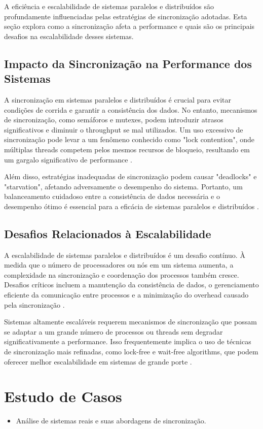 \documentclass[conference]{IEEEtran}
\begin{document}
A eficiência e escalabilidade de sistemas paralelos e distribuídos são profundamente influenciadas pelas estratégias de sincronização adotadas. Esta seção explora como a sincronização afeta a performance e quais são os principais desafios na escalabilidade desses sistemas.

\subsection{Impacto da Sincronização na Performance dos Sistemas}
A sincronização em sistemas paralelos e distribuídos é crucial para evitar condições de corrida e garantir a consistência dos dados. No entanto, mecanismos de sincronização, como semáforos e mutexes, podem introduzir atrasos significativos e diminuir o throughput se mal utilizados. Um uso excessivo de sincronização pode levar a um fenômeno conhecido como "lock contention", onde múltiplas threads competem pelos mesmos recursos de bloqueio, resultando em um gargalo significativo de performance \cite{herlihy2012art}.

Além disso, estratégias inadequadas de sincronização podem causar "deadlocks" e "starvation", afetando adversamente o desempenho do sistema. Portanto, um balanceamento cuidadoso entre a consistência de dados necessária e o desempenho ótimo é essencial para a eficácia de sistemas paralelos e distribuídos \cite{andrews2000foundations}.

\subsection{Desafios Relacionados à Escalabilidade}
A escalabilidade de sistemas paralelos e distribuídos é um desafio contínuo. À medida que o número de processadores ou nós em um sistema aumenta, a complexidade na sincronização e coordenação dos processos também cresce. Desafios críticos incluem a manutenção da consistência de dados, o gerenciamento eficiente da comunicação entre processos e a minimização do overhead causado pela sincronização \cite{coulouris2011distributed}.

Sistemas altamente escaláveis requerem mecanismos de sincronização que possam se adaptar a um grande número de processos ou threads sem degradar significativamente a performance. Isso frequentemente implica o uso de técnicas de sincronização mais refinadas, como lock-free e wait-free algorithms, que podem oferecer melhor escalabilidade em sistemas de grande porte \cite{michael2004scalable}.

\section{Estudo de Casos}
\begin{itemize}
    \item Análise de sistemas reais e suas abordagens de sincronização.
\end{itemize}
\end{document}
